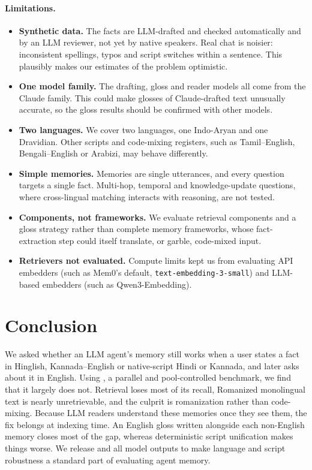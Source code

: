 \paragraph{Limitations.}
\begin{itemize}
\item \textbf{Synthetic data.} The facts are LLM-drafted and checked automatically and by an LLM reviewer, not yet by native speakers. Real chat is noisier: inconsistent spellings, typos and script switches within a sentence. This plausibly makes our estimates of the problem optimistic.
\item \textbf{One model family.} The drafting, gloss and reader models all come from the Claude family. This could make glosses of Claude-drafted text unusually accurate, so the gloss results should be confirmed with other models.
\item \textbf{Two languages.} We cover two languages, one Indo-Aryan and one Dravidian. Other scripts and code-mixing registers, such as Tamil--English, Bengali--English or Arabizi, may behave differently.
\item \textbf{Simple memories.} Memories are single utterances, and every question targets a single fact. Multi-hop, temporal and knowledge-update questions, where cross-lingual matching interacts with reasoning, are not tested.
\item \textbf{Components, not frameworks.} We evaluate retrieval components and a gloss strategy rather than complete memory frameworks, whose fact-extraction step could itself translate, or garble, code-mixed input.
\item \textbf{Retrievers not evaluated.} Compute limits kept us from evaluating API embedders (such as Mem0's default, \texttt{text-embedding-3-small}) and LLM-based embedders (such as Qwen3-Embedding).
\end{itemize}

\section{Conclusion}
\label{sec:conclusion}
We asked whether an LLM agent's memory still works when a user states a fact in Hinglish, Kannada--English or native-script Hindi or Kannada, and later asks about it in English. Using \lipi{}, a parallel and pool-controlled benchmark, we find that it largely does not. Retrieval loses most of its recall, Romanized monolingual text is nearly unretrievable, and the culprit is romanization rather than code-mixing. Because LLM readers understand these memories once they see them, the fix belongs at indexing time. An English gloss written alongside each non-English memory closes most of the gap, whereas deterministic script unification makes things worse. We release \lipi{} and all model outputs to make language and script robustness a standard part of evaluating agent memory.

